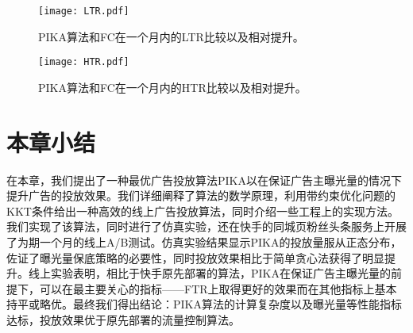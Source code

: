 \begin{figure}[tb]
	\centering
	\texttt{[image: LTR.pdf]}
	\caption{PIKA算法和FC在一个月内的LTR比较以及相对提升。}
	\label{fig:LTR}
\end{figure}

\begin{figure}[tb]
	\centering
	\texttt{[image: HTR.pdf]}
	\caption{PIKA算法和FC在一个月内的HTR比较以及相对提升。}
	\label{fig:HTR}
\end{figure}

\section{本章小结}

在本章，我们提出了一种最优广告投放算法PIKA以在保证广告主曝光量的情况下提升广告的投放效果。我们详细阐释了算法的数学原理，利用带约束优化问题的KKT条件给出一种高效的线上广告投放算法，同时介绍一些工程上的实现方法。我们实现了该算法，同时进行了仿真实验，还在快手的同城页粉丝头条服务上开展了为期一个月的线上A/B测试。仿真实验结果显示PIKA的投放量服从正态分布，佐证了曝光量保底策略的必要性，同时投放效果相比于简单贪心法获得了明显提升。线上实验表明，相比于快手原先部署的算法，PIKA在保证广告主曝光量的前提下，可以在最主要关心的指标——FTR上取得更好的效果而在其他指标上基本持平或略优。最终我们得出结论：PIKA算法的计算复杂度以及曝光量等性能指标达标，投放效果优于原先部署的流量控制算法。






